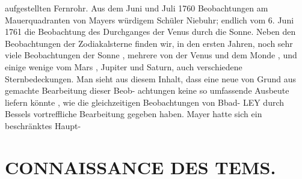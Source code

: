 \documentclass[12pt,a4paper]{article}
\begin{document}
{{{{{{{{aufgestellten  Fernrohr.  Aus dem  Juni  und  Juli  1760  Beobachtungen  am  Mauerquadranten  von  Mayers  würdigem  Schüler  Niebuhr; endlich  vom  6.  Juni  1761  die  Beobachtung  des  Durchganges  der  Venus  durch  die  Sonne.  Neben  den Beobachtungen  der  Zodiakalsterne  finden  wir,  in  den  ersten  Jahren,  noch  sehr  viele  Beobachtungen  der Sonne ,  mehrere  von  der  Venus  und  dem  Monde ,  und  einige  wenige  vom  Mars ,  Jupiter  und  Saturn, auch  verschiedene  Sternbedeckungen. Man  sieht  aus  diesem  Inhalt,  dass  eine  neue  von  Grund  aus  gemachte  Bearbeitung  dieser  Beob- achtungen keine  so  umfassende  Ausbeute  liefern  könnte ,  wie  die  gleichzeitigen  Beobachtungen  von  Bbad- LEY  durch  Bessels  vortreffliche  Bearbeitung  gegeben  haben.    Mayer  hatte  sich  ein  beschränktes  Haupt-


\section*{CONNAISSANCE  DES  TEMS.}

}}}}}}}}
\end{document}
